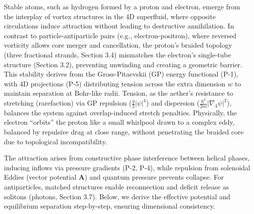 Stable atoms, such as hydrogen formed by a proton and electron, emerge from the interplay of vortex structures in the 4D superfluid, where opposite circulations induce attraction without leading to destructive annihilation. In contrast to particle-antiparticle pairs (e.g., electron-positron), where reversed vorticity allows core merger and cancellation, the proton's braided topology (three fractional strands, Section 3.4) mismatches the electron's single-tube structure (Section 3.2), preventing unwinding and creating a geometric barrier. This stability derives from the Gross-Pitaevskii (GP) energy functional (P-1), with 4D projections (P-5) distributing tension across the extra dimension $w$ to maintain separation at Bohr-like radii. Tension, as the aether's resistance to stretching (rarefaction) via GP repulsion ($\frac{g}{2} |\psi|^4$) and dispersion ($\frac{\hbar^2}{2m} |\nabla_4 \psi|^2$), balances the system against overlap-induced stretch penalties. Physically, the electron ``orbits'' the proton like a small whirlpool drawn to a complex eddy, balanced by repulsive drag at close range, without penetrating the braided core due to topological incompatibility.

The attraction arises from constructive phase interference between helical phases, inducing inflows via pressure gradients (P-2, P-4), while repulsion from solenoidal Eddies (vector potential $\mathbf{A}$) and quantum pressure prevents collapse. For antiparticles, matched structures enable reconnection and deficit release as solitons (photons, Section 3.7). Below, we derive the effective potential and equilibrium separation step-by-step, ensuring dimensional consistency.

